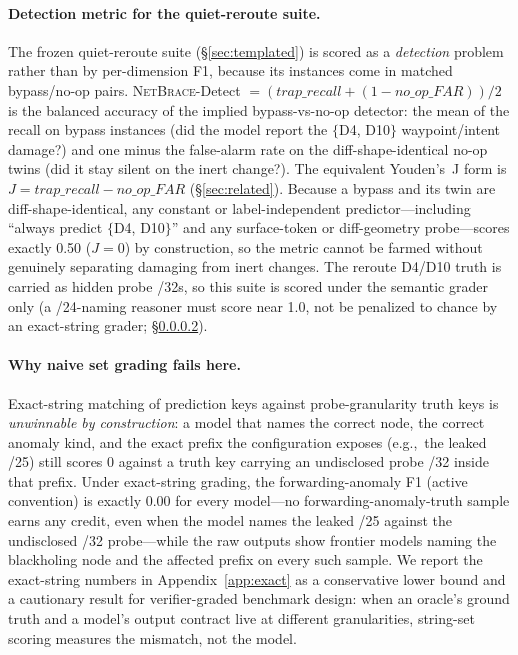 \documentclass[11pt]{article}
\newcommand{\netbrace}{\textsc{NetBrace}}
\newcommand{\eg}{e.g.,\ }
\begin{document}
\paragraph{Detection metric for the quiet-reroute suite.} The frozen
quiet-reroute suite (\S\ref{sec:templated}) is scored as a \emph{detection}
problem rather than by per-dimension F1, because its instances come in matched
bypass/no-op pairs. \netbrace{}-Detect
$=(\textit{trap\_recall}+(1-\textit{no\_op\_FAR}))/2$ is the balanced accuracy of
the implied bypass-vs-no-op detector: the mean of the recall on bypass instances
(did the model report the $\{$D4, D10$\}$ waypoint/intent damage?) and one minus
the false-alarm rate on the diff-shape-identical no-op twins (did it stay silent
on the inert change?). The equivalent Youden's~J form is
$J=\textit{trap\_recall}-\textit{no\_op\_FAR}$ (\S\ref{sec:related}). Because a
bypass and its twin are diff-shape-identical, any constant or label-independent
predictor---including ``always predict $\{$D4, D10$\}$'' and any surface-token or
diff-geometry probe---scores exactly 0.50 ($J=0$) by construction, so the metric
cannot be farmed without genuinely separating damaging from inert changes. The
reroute D4/D10 truth is carried as hidden probe /32s, so this suite is scored
under the semantic grader only (a /24-naming reasoner must score near 1.0, not be
penalized to chance by an exact-string grader; \S\ref{sec:graderfinding}).

\paragraph{Why naive set grading fails here.}
\label{sec:graderfinding}
Exact-string matching of prediction keys against probe-granularity truth
keys is \emph{unwinnable by construction}: a model that names the correct
node, the correct anomaly kind, and the exact prefix the configuration
exposes (\eg the leaked /25) still scores 0 against a truth key carrying an
undisclosed probe /32 inside that prefix. Under exact-string grading, the
forwarding-anomaly F1 (active convention) is exactly 0.00 for every
model---no forwarding-anomaly-truth sample earns any credit, even when the
model names the leaked /25 against the undisclosed /32 probe---while the raw
outputs show frontier models naming the blackholing node and the affected
prefix on every such sample. We report the exact-string
numbers in Appendix~\ref{app:exact} as a conservative lower bound and a
cautionary result for verifier-graded benchmark design: when an oracle's
ground truth and a model's output contract live at different granularities,
string-set scoring measures the mismatch, not the model.
\end{document}
